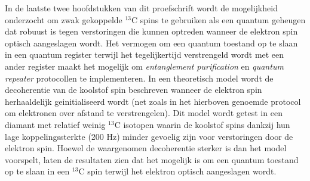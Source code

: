 In de laatste twee hoofdstukken van dit proefschrift wordt de mogelijkheid onderzocht om zwak gekoppelde $^{13}$C spins te gebruiken als een quantum geheugen dat robuust is tegen verstoringen die kunnen optreden wanneer de elektron spin optisch aangeslagen wordt. Het vermogen om een quantum toestand op te slaan in een quantum register terwijl het tegelijkertijd verstrengeld wordt met een ander register maakt het mogelijk om \textit{entanglement purification} en \textit{quantum repeater} protocollen te implementeren. In een theoretisch model wordt de decoherentie van de koolstof spin beschreven wanneer de elektron spin herhaaldelijk geinitialiseerd wordt (net zoals in het hierboven genoemde protocol om elektronen over afstand te verstrengelen). Dit model wordt getest in een diamant met relatief weinig $^{13}$C isotopen waarin de koolstof spins dankzij hun lage koppelingssterkte (200 Hz) minder gevoelig zijn voor verstoringen door de elektron spin. Hoewel de waargenomen decoherentie sterker is dan het model voorspelt, laten de resultaten zien dat het mogelijk is om een quantum toestand op te slaan in een $^{13}$C spin terwijl het elektron optisch aangeslagen wordt.



